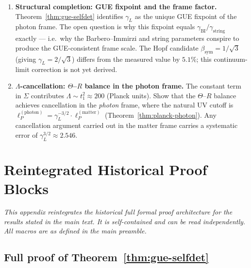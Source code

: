 \documentclass[12pt,a4paper]{article}
\newcommand{\bsym}{\beta_{\mathrm{sym}}}
\newcommand{\gL}{\gamma_L}
\newcommand{\gstring}{\gamma_{\mathrm{string}}}
\newcommand{\gBI}{\gamma_{\mathrm{BI}}}
\newcommand{\lP}{\ell_P}
\begin{document}
\begin{enumerate}
  \item \textbf{Structural completion: GUE fixpoint and the frame factor.}
        Theorem~\ref{thm:gue-selfdet} identifies $\gL$ as the unique
        GUE fixpoint of the photon frame.
        The open question is why this fixpoint equals $\gBI/\gstring$
        exactly --- i.e.\ why the Barbero--Immirzi and string parameters
        conspire to produce the GUE-consistent frame scale.
        The Hopf candidate $\bsym=1/\sqrt{3}$ (giving $\gL=2/\sqrt{3}$)
        differs from the measured value by $5.1\%$; this continuum-limit
        correction is not yet derived.

  \item \textbf{$\Lambda$-cancellation: $\Theta$--$R$ balance in the
        photon frame.}
        The constant term in $\Sigma$ contributes
        $\Lambda\sim t_1^2\approx 200$ (Planck units).
        Show that the $\Theta$--$R$ balance achieves cancellation in the
        \emph{photon} frame, where the natural UV cutoff is
        $\lP^{(\mathrm{photon})}=\gL^{-3/2}\cdot\lP^{(\mathrm{matter})}$
        (Theorem~\ref{thm:planck-photon}).
        Any cancellation argument carried out in the matter frame carries
        a systematic error of $\gL^{3/2}\approx 2.546$.
\end{enumerate}







\appendix

\section{Reintegrated Historical Proof Blocks}
\label{app:formal-reintegrated}

\textit{This appendix reintegrates the historical full formal proof architecture
for the results stated in the main text.
It is self-contained and can be read independently.
All macros are as defined in the main preamble.}

\subsection{Full proof of Theorem~\ref{thm:gue-selfdet}}
\label{app:gue-selfdet-reintegrated}
\end{document}
